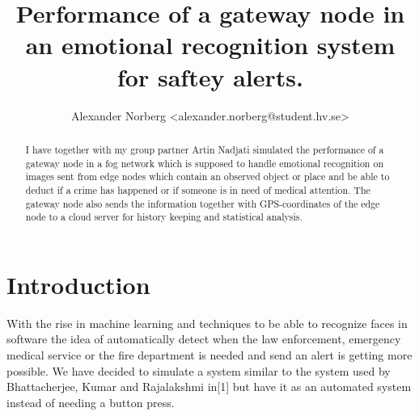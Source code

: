 \documentclass[a4paper,11pt,notitlepage,twocolumn]{article}
\title{Performance of a gateway node in an emotional recognition system for saftey alerts.}
\author{Alexander Norberg <alexander.norberg@student.hv.se>}
\begin{document}
  \maketitle
  \begin{abstract}
    I have together with my group partner Artin Nadjati simulated the performance of a
    gateway node in a fog network which is supposed to handle emotional recognition on
    images sent from edge nodes which contain an observed object or place and be able to
    deduct if a crime has happened or if someone is in need of medical attention. The
    gateway node also sends the information together with GPS-coordinates of the edge
    node to a cloud server for history keeping and statistical analysis.
  \end{abstract}
  
  \section{Introduction}
    With the rise in machine learning and techniques to be able to recognize faces in
    software the idea of automatically detect when the law enforcement, emergency medical
    service or the fire department is needed and send an alert is getting more possible.
    We have decided to simulate a system similar to the system used by Bhattacherjee, Kumar
    and Rajalakshmi in[1] but have it as an automated system instead of needing a button
    press.
\end{document}
